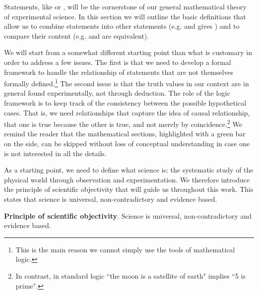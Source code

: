 Statements, like  or , will be the cornerstone of our general mathematical theory of experimental science. In this section we will outline the basic definitions that allow us to combine statements into other statements (e.g.  and  gives ) and to compare their content (e.g.  and  are equivalent).

We will start from a somewhat different starting point than what is customary in order to address a few issues. The first is that we need to develop a formal framework to handle the relationship of statements that are not themselves formally defined.\footnote{This is the main reason we cannot simply use the tools of mathematical logic.} The second issue is that the truth values in our context are in general found experimentally, not through deduction. The role of the logic framework is to keep track of the consistency between the possible hypothetical cases. That is, we need relationships that capture the idea of causal relationship, that one is true because the other is true, and not merely by coincidence.\footnote{In contrast, in standard logic ``the moon is a satellite of earth" implies ``5 is prime".} We remind the reader that the mathematical sections, highlighted with a green bar on the side, can be skipped without loss of conceptual understanding in case one is not interested in all the details. 

As a starting point, we need to define what science is: the systematic study of the physical world through observation and experimentation. We therefore introduce the principle of scientific objectivity that will guide us throughout this work. This states that science is universal, non-contradictory and evidence based.

\begin{mathSection}
	\textbf{Principle of scientific objectivity}.
	Science is universal, non-contradictory and evidence based.
\end{mathSection}

